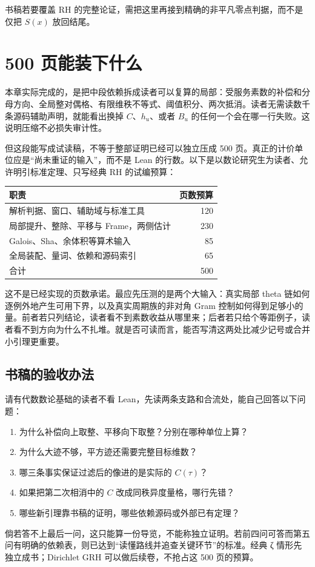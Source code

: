 书稿若要覆盖 RH 的完整论证，需把这里再接到精确的非平凡零点判据，而不是仅把 $S(x)$ 放回结尾。

\section{500 页能装下什么}
本章实际完成的，是把中段依赖拆成读者可以复算的局部：受服务素数的补偿和分母方向、全局整对偶格、有限维秩不等式、阈值积分、两次抵消。读者无需读数千条源码辅助声明，就能看出换掉 $C$、$h_u$、或者 $B_u$ 的任何一个会在哪一行失败。这说明压缩不必损失审计性。

但这段能写成试读稿，不等于整部证明已经可以独立压成 500 页。真正的计价单位应是“尚未重证的输入”，而不是 Lean 的行数。以下是以数论研究生为读者、允许明引标准定理、只写经典 RH 的试编预算：
\begin{center}
\begin{tabularx}{\linewidth}{@{}Xr@{}}
\toprule
职责 & 页数预算\\\midrule
解析判据、窗口、辅助域与标准工具 & 120\\
局部提升、整除、平移与 Frame，两侧估计 & 230\\
Galois、Sha、余体积等算术输入 & 85\\
全局装配、量词、依赖和源码索引 & 65\\\midrule
合计 & 500\\\bottomrule
\end{tabularx}
\end{center}
这不是已经实现的页数承诺。最应先压测的是两个大输入：真实局部 theta 链如何逐例外地产生可用下界，以及真实周期族的非对角 Gram 控制如何得到足够小的量。前者若只列结论，读者看不到素数收益从哪里来；后者若只给个等距例子，读者看不到方向为什么不扎堆。就是否可读而言，能否写清这两处比减少记号或合并小引理更重要。

\subsection*{书稿的验收办法}
请有代数数论基础的读者不看 Lean，先读两条支路和合流处，能自己回答以下问题：
\begin{enumerate}
 \item 为什么补偿向上取整、平移向下取整？分别在哪种单位上算？
 \item 为什么大迹不够，平方迹还需要完整目标维数？
 \item 哪三条事实保证过滤后的像进的是实际的 $C(\tau)$？
 \item 如果把第二次相消中的 $C$ 改成同秩异度量格，哪行先错？
 \item 哪些新引理靠书稿的证明，哪些依赖源码或外部已有定理？
\end{enumerate}
倘若答不上最后一问，这只能算一份导览，不能称独立证明。若前四问可答而第五问有明确的依赖表，则已达到“读懂路线并追查关键环节”的标准。经典 ζ 情形先独立成书；Dirichlet GRH 可以做后续卷，不抢占这 500 页的预算。

